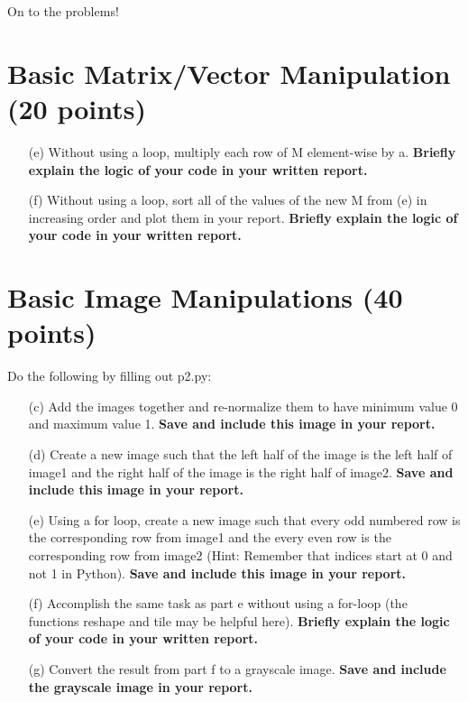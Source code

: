 




On to the problems!

\section{Basic Matrix/Vector Manipulation (20 points)}

\begin{itemize}
	\item[(e)]
	Without using a loop, multiply each row of M element-wise by a. \textbf{Briefly explain the logic of your code in your written report.}
  
	\item[(f)]
	Without using a loop, sort all of the values of the new M from (e) in increasing order
	and plot them in your report. \textbf{Briefly explain the logic of your code in your written report.}
\end{itemize}

\section{Basic Image Manipulations (40 points)}	
Do the following by filling out p2.py:
\begin{itemize}

	\item[(c)]
	Add the images together and re-normalize them to have minimum value 0
	and maximum value 1. \textbf{Save and include this image in your report.}
	
	\item[(d)]
	Create a new image such that the left half of the image is the left half of
	image1 and the right half of the image is the right half of image2. \textbf{Save and include this image in your report.}
	
	\item[(e)]
	Using a for loop, create a new image such that every odd numbered row is
	the corresponding row from image1 and the every even row is the corresponding row
	from image2 (Hint: Remember that indices start at 0 and not 1 in Python). \textbf{Save and include this image in your report.}
	
	\item[(f)]
	Accomplish the same task as part e without using a for-loop (the functions reshape and
  tile may be helpful here). \textbf{Briefly explain the logic of your code in your written report.}
	
	\item[(g)]
	Convert the result from part f to a grayscale image. \textbf{Save and include the grayscale image in your report.}
\end{itemize}
	
